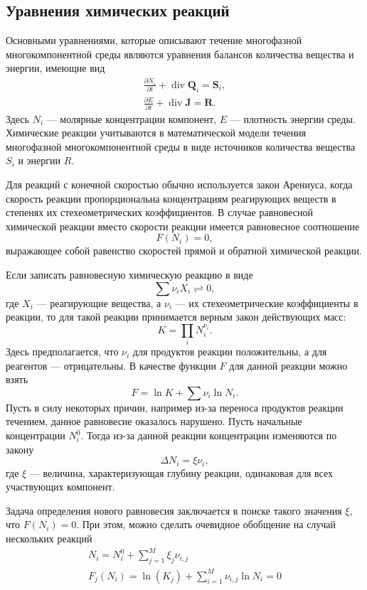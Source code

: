 \documentclass[14pt,a4paper]{extarticle}
\newcommand{\pd}[2]{\frac{\partial #1}{\partial #2}}
\renewcommand{\div}{\operatorname{div}}
\renewcommand{\vec}[1]{\boldsymbol{\mathbf{#1}}}
\begin{document}
\subsection{Уравнения химических реакций}

Основными уравнениями, которые описывают течение многофазной многокомпонентной среды являются уравнения балансов количества вещества и энергии, имеющие вид
\begin{gather*}
\pd{N_i}{t} + \div \vec Q_i = \vec S_i,\\
\pd{E}{t} + \div \vec J = \vec R.
\end{gather*}
Здесь $N_i$ --- молярные концентрации компонент, $E$ --- плотность энергии среды. Химические реакции учитываются в математической модели течения многофазной многокомпонентной среды в виде источников количества вещества $S_i$ и энергии $R$.

Для реакций с конечной скоростью обычно используется закон Арениуса, когда скорость реакции пропорциональна концентрациям реагирующих веществ в степенях их стехеометрических коэффициентов.
В случае равновесной химической реакции вместо скорости реакции имеется равновесное соотношение
$$F(N_i) = 0,$$
выражающее собой равенство скоростей прямой и обратной химической реакции.

Если записать равновесную химическую реакцию в виде 
$$\sum{\nu_i X_i} \rightleftharpoons 0,$$
где $X_i$ --- реагирующие вещества, а $\nu_i$ --- их стехеометрические коэффициенты в реакции, то для такой реакции принимается верным закон действующих масс:
$$
K = \prod_i N_i^{\nu_i}.
$$
Здесь предполагается, что $\nu_i$ для продуктов реакции положительны, а для реагентов --- отрицательны. В качестве функции $F$ для данной реакции можно взять 
$$F = \ln{K} + \sum{\nu_i \ln{N_i}}.$$
Пусть в силу  некоторых причин, например из-за переноса продуктов реакции течением, данное равновесие оказалось нарушено. Пусть начальные концентрации $N_i^0$. Тогда из-за данной реакции концентрации изменяются по закону $$\Delta N_i = \xi \nu_i,$$ где $\xi$ --- величина, характеризующая глубину реакции, одинаковая для всех участвующих компонент.

Задача определения нового равновесия заключается в поиске такого значения $\xi$, что $F(N_i) = 0$. При этом, можно сделать очевидное обобщение на случай нескольких реакций
\begin{gather*}
N_i = N_i^0 + \sum_{j=1}^{M} \xi_j\nu_{i,j}\\
F_j(N_i)=\ln(K_j) + \sum_{i=1}^{M} \nu_{i,j}\ln{N_i} = 0
\end{gather*}
 
\end{document}
